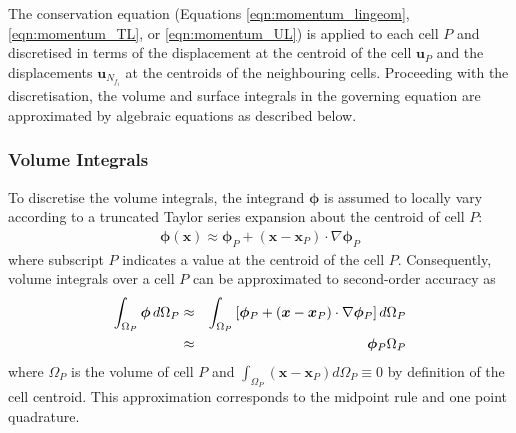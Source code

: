 \documentclass[sn-mathphys,Numbered]{sn-jnl}%
\newcommand{\bb}{\boldsymbol}
\begin{document}
The conservation equation (Equations \ref{eqn:momentum_lingeom}, \ref{eqn:momentum_TL}, or \ref{eqn:momentum_UL}) is applied to each cell $P$ and discretised in terms of the displacement at the centroid of the cell $\boldsymbol{u}_P$ and the displacements $\boldsymbol{u}_{N_{f_i}}$ at the centroids of the neighbouring cells.
Proceeding with the discretisation, the volume and surface integrals in the governing equation are approximated by algebraic equations as described below.


\subsubsection{Volume Integrals}
To discretise the volume integrals, the integrand $\bb{\phi}$ is assumed to locally vary according to a truncated Taylor series expansion about the centroid of cell $P$:
\begin{eqnarray}
	\bb{\phi}(\bb{x})  \approx \bb{\phi}_P + (\bb{x} - \bb{x}_P) \cdot \nabla \bb{\phi}_P
\end{eqnarray}
where subscript $P$ indicates a value at the centroid of the cell $P$.
Consequently, volume integrals over a cell $P$ can be approximated to second-order accuracy as
\begin{eqnarray} \label{eq:volume_integral}
	\int_{\Omega_P} \bb{\phi} \, d \Omega_P
		&\approx& \int_{\Omega_P}  \left[ \bb{\phi}_P + (\bb{x} - \bb{x}_P) \cdot \nabla \bb{\phi}_P \right] d \Omega_P \notag \\
		&\approx& \bb{\phi}_P \Omega_P
\end{eqnarray}
where $\Omega_P$ is the volume of cell $P$ and $\int_{\Omega_P} (\bb{x} - \bb{x}_P) d\Omega_P \equiv 0$ by definition of the cell centroid.
This approximation corresponds to the midpoint rule and one point quadrature.
\end{document}
